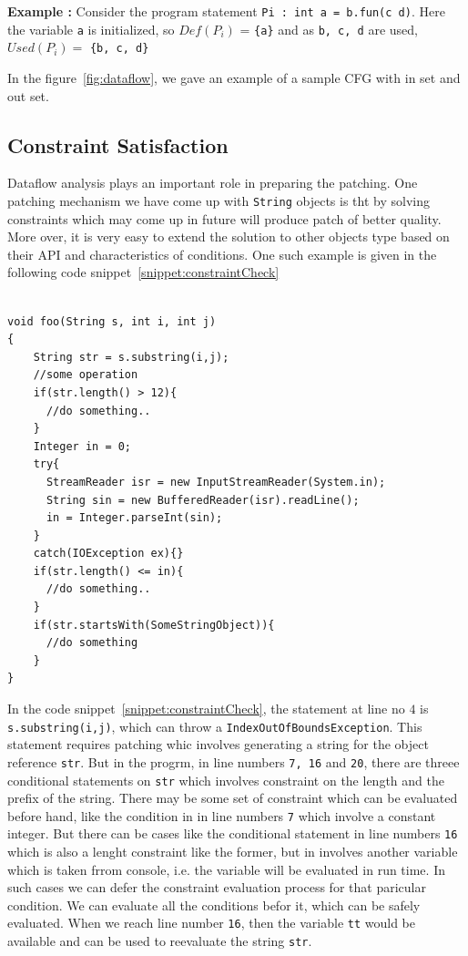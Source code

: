 \textbf{Example : } Consider the program statement \texttt{Pi : int a = b.fun(c
d)}.
Here the variable \texttt{a} is initialized, so $Def(P_i)$ = \texttt{\{a\}} and
as
\texttt{b, c, d} are used, $Used(P_i) =$ \texttt{\{b, c, d\}}

In the figure~\ref{fig:dataflow}, we gave an example of a sample CFG with in set
and out set.

\subsection{Constraint Satisfaction}
\label{subsec:constraintSatisfaction}

Dataflow analysis plays an important role in preparing the patching. One
patching mechanism we have come up with \texttt{String} objects is tht by
solving constraints which may come up in future will produce patch of better
quality. More over, it is very easy to extend the solution to other objects type
based on their API and characteristics of conditions. One such example is given
in the following code snippet~\ref{snippet:constraintCheck}


\lstset{language=Java, caption=Better patching mechanism with constraint
satisfaction, label = snippet:constraintCheck}
\begin{lstlisting}

void foo(String s, int i, int j)
{
	String str = s.substring(i,j);
	//some operation
	if(str.length() > 12){
	  //do something..
	}
	Integer in = 0;
	try{
	  StreamReader isr = new InputStreamReader(System.in);
	  String sin = new BufferedReader(isr).readLine();
	  in = Integer.parseInt(sin);
	}
	catch(IOException ex){}
	if(str.length() <= in){
	  //do something..
	}
	if(str.startsWith(SomeStringObject)){
	  //do something
	}
}

\end{lstlisting}

In the code snippet~\ref{snippet:constraintCheck}, the statement at line no $4$
is \texttt{s.substring(i,j)}, which can throw a
\texttt{IndexOutOfBoundsException}. This statement requires patching whic
involves generating a string for the object reference \texttt{str}. But in the
progrm, in line numbers \texttt{7, 16} and \texttt{20}, there are threee
conditional statements on \texttt{str} which involves constraint on the length
and the prefix of the string. There may be some set of constraint which can be
evaluated before hand, like the condition in in line numbers \texttt{7} which
involve a constant integer. But there can be cases like the conditional
statement in line numbers \texttt{16} which is also a lenght constraint like the
former, but in involves another variable which is taken frrom console, i.e. the
variable will be evaluated in run time. In such cases we can defer the
constraint evaluation process for that paricular condition. We can evaluate all
the conditions befor it, which can be safely evaluated. When we reach line
number \texttt{16}, then the variable \texttt{tt} would be available and can be
used to reevaluate the string \texttt{str}.

